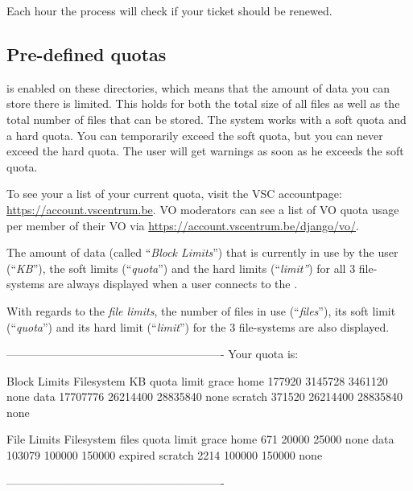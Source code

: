 \begin{prompt}
\end{prompt}

Each hour the process will check if your ticket should be renewed.


\fi


\subsection{Pre-defined quotas}
\label{subsec:predfined-quotas}
\hypertarget{predefined-quotas}{}

 is enabled on these directories, which means that the amount of
data you can store there is limited. This holds for both the total size of all
files as well as the total number of files that can be stored. The system works
with a soft quota and a hard quota. You can temporarily exceed the soft quota,
but you can never exceed the hard quota. The user will get warnings as soon as
he exceeds the soft quota.


\ifgent
To see your a list of your current quota, visit the VSC accountpage: \url{https://account.vscentrum.be}.
VO moderators can see a list of VO quota usage per member of their VO via \url{https://account.vscentrum.be/django/vo/}.
\fi

\ifantwerpen
The amount of data (called ``\emph{Block Limits}'') that is currently in use
by the user (``\emph{KB}''), the soft limits (``\emph{quota}'') and the
hard limits (``\emph{limit''}) for all 3 file-systems are always displayed
when a user connects to the \hpc.

 With regards to the \emph{file limits}, the number of files in use
 (``\emph{files}''), its soft limit (``\emph{quota}'') and its hard limit
 (``\emph{limit}'') for the 3 file-systems are also displayed.

\begin{prompt}
----------------------------------------------------------
Your quota is:

                   Block Limits
   Filesystem         KB      quota      limit    grace
   home           177920    3145728    3461120     none
   data         17707776   26214400   28835840     none
   scratch        371520   26214400   28835840     none

                File Limits
   Filesystem      files      quota      limit    grace
   home              671      20000      25000     none
   data           103079     100000     150000  expired
   scratch          2214     100000     150000     none

----------------------------------------------------------
\end{prompt}

